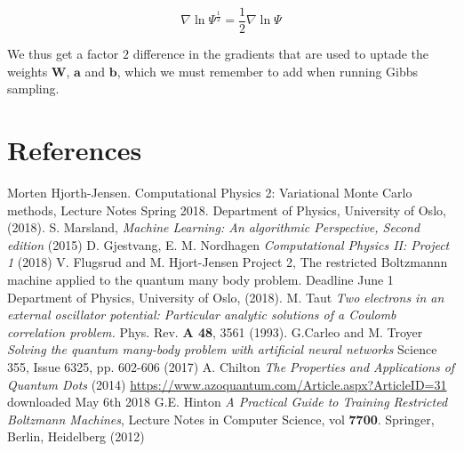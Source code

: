 \documentclass[norsk,a4paper,12pt]{article}
\begin{document}
\begin{equation}
	\nabla \ln \Psi^{\frac{1}{2}} = \frac{1}{2} \nabla \ln \Psi
\end{equation}

We thus get a factor $2$ difference in the gradients that are used to uptade the weights $\boldsymbol{W}$, $\boldsymbol{a}$ and $\boldsymbol{b}$, which we must remember to add when running Gibbs sampling.


\newpage
\section{References}

\begingroup
\renewcommand{\section}[2]{}
\begin{thebibliography}{}
	Morten Hjorth-Jensen.
	Computational Physics 2: Variational Monte Carlo methods, Lecture Notes Spring 2018.
	Department of Physics, University of Oslo,
	(2018).
	S. Marsland, \emph{Machine Learning: An algorithmic Perspective, Second edition} (2015)
	 D. Gjestvang, E. M. Nordhagen \emph{Computational Physics II: Project 1} (2018)
	 V. Flugsrud and M. Hjort-Jensen
	 Project 2, The restricted Boltzmannn machine applied to the quantum many body problem. Deadline June 1
	 Department of Physics, University of Oslo,
	 (2018).
	 M. Taut \emph{Two electrons in an external oscillator potential: Particular analytic solutions of a Coulomb correlation problem.} Phys. Rev. \textbf{A 48}, 3561 (1993).
	 G.Carleo and M. Troyer  \emph{Solving the quantum many-body problem with artificial neural networks} Science 355, Issue 6325, pp. 602-606 (2017)
	 A. Chilton \emph{The Properties and Applications of Quantum Dots} (2014) \url{https://www.azoquantum.com/Article.aspx?ArticleID=31} downloaded May 6th 2018
	 G.E. Hinton \emph{A Practical Guide to Training Restricted Boltzmann Machines}, Lecture Notes in Computer Science, vol \textbf{7700}. Springer, Berlin, Heidelberg (2012)

	
	
\end{thebibliography}
\endgroup
\end{document}
